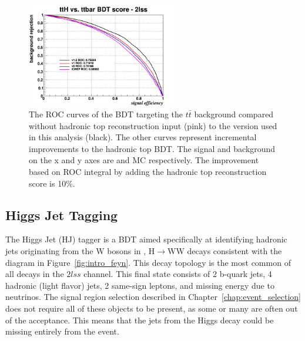 \begin{figure}[htb]
 \centering
   \includegraphics[width=0.6\textwidth]{ch8_figs/improvement_roc.png}
   \caption[ROC curves of $t\bar{t}$ BDT with and without hadronic top reconstruction input]{The ROC curves of the BDT targeting the $t\bar{t}$ background compared without 
   hadronic top reconstruction input (pink) to the version used in this analysis (black). The other curves represent incremental improvements to the hadronic top BDT. The signal
   and background on the x and y axes are \tth and \ttbar MC respectively. The improvement based on ROC integral by adding the hadronic top reconstruction score is 10$\%$.}
  \label{fig:hadtop_performance}
\end{figure}

\subsection{Higgs Jet Tagging}
The Higgs Jet (HJ) tagger is a BDT aimed specifically at identifying hadronic jets originating from the W bosons in \tth, H$\rightarrow$WW decays consistent
with the \tth diagram in Figure~\ref{fig:intro_feyn}. This decay topology is the most common of all \tth decays in the $2lss$ channel. This final state
consists of 2 b-quark jets, 4 hadronic (light flavor) jets, 2 same-sign leptons, and missing energy due to neutrinos. The signal region selection described
in Chapter~\ref{chap:event_selection} does not require all of these objects to be present, as some or many are often out of the acceptance. This means that
the jets from the Higgs decay could be missing entirely from the event.

